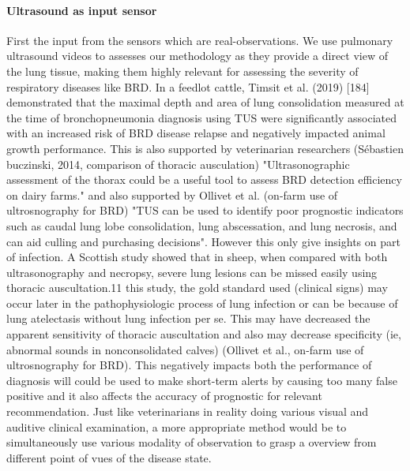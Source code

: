 \paragraph{Ultrasound as input sensor}First the input from the sensors which are real-observations. We use pulmonary ultrasound videos to assesses our methodology as they provide a direct view of the lung tissue, making them highly relevant for assessing the severity of respiratory diseases like BRD.  In a feedlot cattle, Timsit et al. (2019) [184] demonstrated that the maximal depth and area of lung consolidation measured at the time of bronchopneumonia diagnosis using TUS were significantly associated with an increased risk of BRD disease relapse and negatively impacted animal growth performance. This is also supported by veterinarian researchers (Sébastien buczinski, 2014, comparison of thoracic ausculation) "Ultrasonographic assessment of the thorax could be a useful tool to assess BRD detection efficiency on dairy farms." and also supported by Ollivet et al. (on-farm use of ultrosnography for BRD) "TUS can be used to identify poor prognostic indicators such as caudal lung lobe consolidation, lung abscessation, and lung necrosis, and can aid culling and purchasing decisions". However this only give insights on part of infection. A Scottish study showed that in sheep, when compared with both ultrasonography and necropsy, severe lung lesions can be missed easily using thoracic auscultation.11  this study, the gold standard used (clinical signs) may occur later in the pathophysiologic process of lung infection or can be because of lung atelectasis without lung infection per se. This may have decreased the apparent sensitivity of thoracic auscultation and also may decrease specificity (ie, abnormal sounds in nonconsolidated calves) (Ollivet et al., on-farm use of ultrosnography for BRD). This negatively impacts both the performance of diagnosis will could be used to make short-term alerts by causing too many false positive and it also affects the accuracy of prognostic for relevant recommendation.
Just like veterinarians in reality doing various visual and auditive clinical examination, a more appropriate method would be to simultaneously use various modality of observation to grasp a overview from different point of vues of the disease state.


